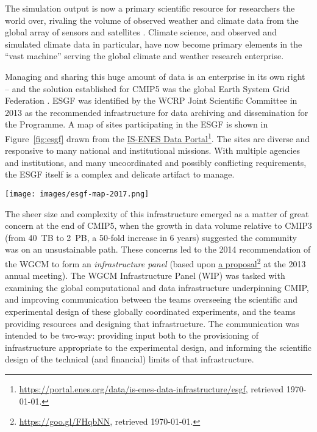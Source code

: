 \documentclass[gmd,manuscript]{copernicus}
\newcommand{\urlref}[2] {\href{#1}{#2}\footnote{\url{#1}, retrieved \today.}}
\begin{document}
The simulation output is now a primary scientific resource for
researchers the world over, rivaling the volume of observed weather
and climate data from the global array of sensors and satellites
\citep{ref:overpecketal2011}. Climate science, and observed and simulated
climate data in particular, have now become primary elements in the
``vast machine'' \citep{ref:edwards2010} serving the global climate and
weather research enterprise.

Managing and sharing this huge amount of data is an enterprise in its
own right -- and the solution established for CMIP5 was the global
Earth System Grid Federation
\citep[ESGF,][]{ref:williamsetal2011a,ref:williamsetal2015}. ESGF was
identified by the WCRP Joint Scientific Committee in 2013 as the
recommended infrastructure for data archiving and dissemination for
the Programme.
A map of sites participating in the ESGF is shown in
Figure~\ref{fig:esgf} drawn from the
\urlref{https://portal.enes.org/data/is-enes-data-infrastructure/esgf}{IS-ENES
  Data Portal}. The sites are diverse and responsive to many national
and institutional missions. With multiple agencies and institutions,
and many uncoordinated and possibly conflicting requirements, the ESGF
itself is a complex and delicate
artifact to manage.

\begin{figure*}
  \begin{center}
    \texttt{[image: images/esgf-map-2017.png]}
  \end{center}
  \caption{Sites participating in the Earth System Grid Federation in
    May 2017. Figure courtesy IS-ENES Data Portal. }
  \label{fig:esgf}
\end{figure*}

The sheer size and complexity of this infrastructure emerged as a
matter of great concern at the end of CMIP5, when the growth in data
volume relative to CMIP3 (from 40~TB to 2~PB, a 50-fold increase in 6
years) suggested the community was on an unsustainable path. These
concerns led to the 2014 recommendation of the WGCM to form an
\emph{infrastructure panel} (based upon
\urlref{https://goo.gl/FHqbNN}{a proposal} at the 2013 annual
meeting). The WGCM Infrastructure Panel (WIP) was tasked with
examining the global computational and data infrastructure
underpinning CMIP, and improving communication between the teams
overseeing the scientific and experimental design of these globally
coordinated experiments, and the teams providing resources and
designing that infrastructure. The communication was intended to be
two-way: providing input both to the provisioning of infrastructure
appropriate to the experimental design, and informing the scientific
design of the technical (and financial) limits of that infrastructure.
\end{document}
